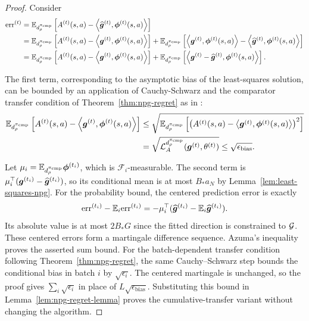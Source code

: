 \begin{proof}
    Consider 
    \begin{align}
        \text{err}^{(t)} 
        &= \mathbb{E}_{d_\rho^{\pi_{\rm cmp}}}\left[A^{(t)}(s,a) - \left\langle\widehat{\bm{g}}^{(t)}, {\boldsymbol{\phi}}^{(t)}(s,a)\right\rangle\right] \\
        &= \mathbb{E}_{d_\rho^{\pi_{\rm cmp}}}\left[A^{(t)}(s,a) - \left\langle{\bm{g}}^{(t)}, \boldsymbol{\phi}^{(t)}(s,a)\right\rangle\right] + \mathbb{E}_{d_\rho^{\pi_{\rm cmp}}}\left[\left\langle{\bm{g}}^{(t)}, \boldsymbol{\phi}^{(t)}(s,a)\right\rangle - \left\langle\widehat{\bm{g}}^{(t)}, {\boldsymbol{\phi}}^{(t)}(s,a)\right\rangle\right]\\
        &= \mathbb{E}_{d_\rho^{\pi_{\rm cmp}}}\left[A^{(t)}(s,a) - \left\langle{\bm{g}}^{(t)}, \boldsymbol{\phi}^{(t)}(s,a)\right\rangle\right] 
        + \mathbb{E}_{d_\rho^{\pi_{\rm cmp}}}\left[\left\langle{\bm{g}}^{(t)} - \widehat{\bm{g}}^{(t)}, \boldsymbol{\phi}^{(t)}(s,a)\right\rangle\right].
    \end{align}

    The first term, corresponding to the asymptotic bias of the least-squares solution, can be bounded by an application of Cauchy-Schwarz and the comparator transfer condition of Theorem~\ref{thm:npg-regret} as in \citet{agarwal2021theory}:
    \begin{align}
        \mathbb{E}_{d_\rho^{\pi_{\rm cmp}}}\left[A^{(t)}(s,a) - \left\langle{\bm{g}}^{(t)}, \boldsymbol{\phi}^{(t)}(s,a)\right\rangle\right] &\leq \sqrt{\mathbb{E}_{d_\rho^{\pi_{\rm cmp}}}\left[\left(A^{(t)}(s,a) - \left\langle{\bm{g}}^{(t)}, \boldsymbol{\phi}^{(t)}(s,a)\right\rangle\right)^2\right]}\\
    &= \sqrt{{\mathcal{L}}_A^{d_\rho^{\pi_{\rm cmp}}}(\bm{g}^{(t)}, \theta^{(t)})} \leq \sqrt{\epsilon_{\text{bias}}}.
    \end{align}

    

    Let $\mu_i=\mathbb{E}_{d_\rho^{\pi_{\rm cmp}}}\boldsymbol{\phi}^{(t_i)}$, which is
$\mathcal F_i$-measurable. The second term is
$\mu_i^\top(\bm{g}^{(t_i)}-\widehat{\bm{g}}^{(t_i)})$, so its conditional mean is
at most $B_*a_N$ by Lemma~\ref{lem:least-squares-npg}. For the probability
bound, the centered prediction error is exactly
\[
\mathrm{err}^{(t_i)}-\mathbb{E}_i\mathrm{err}^{(t_i)}
=-\mu_i^\top(\widehat{\bm{g}}^{(t_i)}-\mathbb{E}_i\widehat{\bm{g}}^{(t_i)}).
\]
Its absolute value is at most $2B_*G$ since the fitted direction is constrained
to ${\mathcal{G}}$. These centered errors form a martingale difference sequence.
Azuma's inequality proves the asserted sum bound.
For the batch-dependent transfer condition following
Theorem~\ref{thm:npg-regret}, the same Cauchy--Schwarz step bounds the
conditional bias in batch $i$ by $\sqrt{\epsilon_i}$.
The centered martingale is unchanged, so the proof gives
$\sum_i\sqrt{\epsilon_i}$ in place of $L\sqrt{\epsilon_{\mathrm{bias}}}$.
Substituting this bound in Lemma~\ref{lem:npg-regret-lemma} proves the
cumulative-transfer variant without changing the algorithm.
\end{proof}


